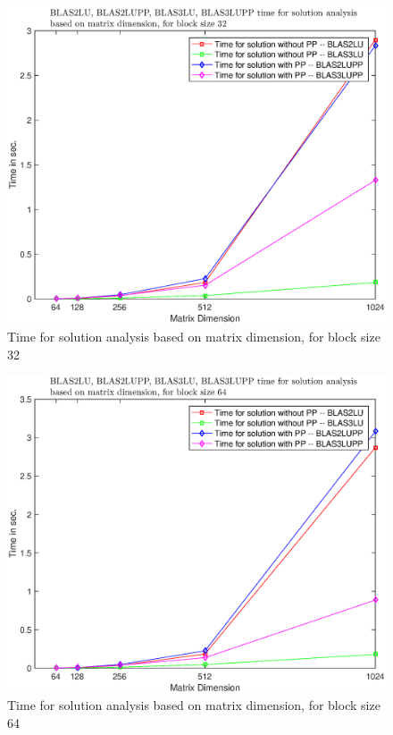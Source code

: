 \documentclass[conference,compsoc]{IEEEtran}
\begin{document}
     \begin{figure}[H]
     \centering
     \includegraphics[width=1\columnwidth]{EPS/time_32.eps}
     \caption{Time for solution analysis based on matrix dimension, for block size 32}\label{graph:time_32}
     \end{figure}


    \begin{figure}[H]
     \centering
     \includegraphics[width=1\columnwidth]{EPS/time_64.eps}
     \caption{Time for solution analysis based on matrix dimension, for block size 64}\label{graph:time_64}
     \end{figure}
  
\end{document}
